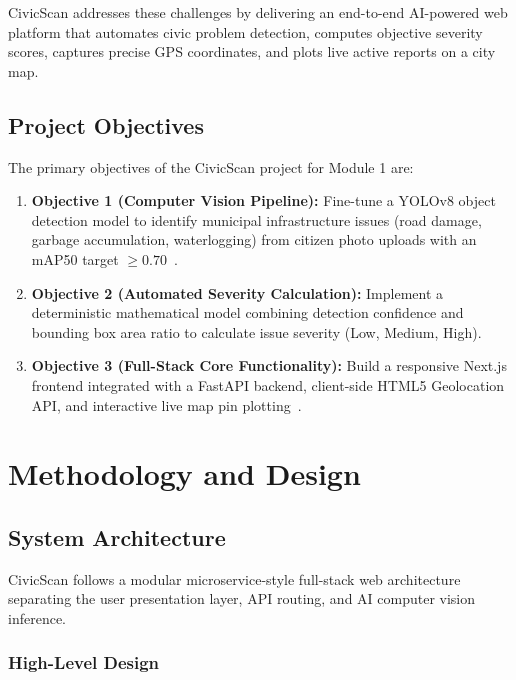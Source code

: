 \documentclass{tietreport}
\begin{document}
CivicScan addresses these challenges by delivering an end-to-end AI-powered web platform that automates civic problem detection, computes objective severity scores, captures precise GPS coordinates, and plots live active reports on a city map.

\section{Project Objectives}

The primary objectives of the CivicScan project for Module 1 are:

\begin{enumerate}
  \item \textbf{Objective 1 (Computer Vision Pipeline):} Fine-tune a YOLOv8 object detection model to identify municipal infrastructure issues (road damage, garbage accumulation, waterlogging) from citizen photo uploads with an mAP50 target $\ge 0.70$~\cite{ultralytics2023yolov8}.
  \item \textbf{Objective 2 (Automated Severity Calculation):} Implement a deterministic mathematical model combining detection confidence and bounding box area ratio to calculate issue severity (Low, Medium, High).
  \item \textbf{Objective 3 (Full-Stack Core Functionality):} Build a responsive Next.js frontend integrated with a FastAPI backend, client-side HTML5 Geolocation API, and interactive live map pin plotting~\cite{fastapi2024, nextjs2024}.
\end{enumerate}



\chapter{Methodology and Design}

\section{System Architecture}

CivicScan follows a modular microservice-style full-stack web architecture separating the user presentation layer, API routing, and AI computer vision inference.

\subsection{High-Level Design}
\end{document}
